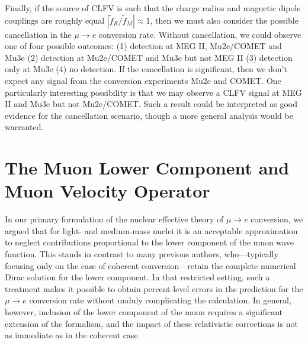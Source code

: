 \documentclass{book}[letterpaper,12pt]
\begin{document}
Finally, if the source of CLFV is such that the charge radius and magnetic dipole couplings are roughly equal $|\tilde{f}_R/\tilde{f}_M|\approx 1$, then we must also consider the possible cancellation in the $\mu\rightarrow e$ conversion rate. Without cancellation, we could observe one of four possible outcomes: (1) detection at MEG II, Mu2e/COMET and Mu3e (2) detection at Mu2e/COMET and Mu3e but not MEG II (3) detection only at Mu3e (4) no detection. If the cancellation is significant, then we don't expect any signal from the conversion experiments Mu2e and COMET. One particularly interesting possibility is that we may observe a CLFV signal at MEG II and Mu3e but not Mu2e/COMET. Such a result could be interpreted as good evidence for the cancellation scenario, though a more general analysis would be warranted.
\chapter{The Muon Lower Component and Muon Velocity Operator}
In our primary formulation of the nuclear effective theory of $\mu\rightarrow e$ conversion, we argued that for light- and medium-mass nuclei it is an acceptable approximation to neglect contributions proportional to the lower component of the muon wave function. This stands in contrast to many previous authors, who---typically focusing only on the case of coherent conversion---retain the complete numerical Dirac solution for the lower component. In that restricted setting, such a treatment makes it possible to obtain percent-level errors in the prediction for the $\mu\rightarrow e$ conversion rate without unduly complicating the calculation. In general, however, inclusion of the lower component of the muon requires a significant extension of the formalism, and the impact of these relativistic corrections is not as immediate as in the coherent case.  
\end{document}
